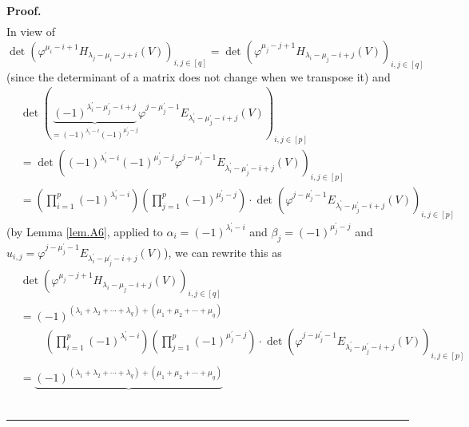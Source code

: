 \documentclass[numbers=enddot,12pt,final,onecolumn,notitlepage]{scrartcl}%
\theoremstyle{definition}
\newenvironment{proof}[1][Proof]{\noindent\textbf{#1.} }{\ \rule{0.5em}{0.5em}}
\let\prodnonlimits\prod
\renewcommand{\prod}{\prodnonlimits\limits}
\begin{document}
\begin{enumerate}
\begin{proof}
\begin{align*}
\end{align*}
In view of%
\[
\det\left(  \varphi^{\mu_{i}-i+1}H_{\lambda_{j}-\mu_{i}-j+i}\left(  V\right)
\right)  _{i,j\in\left[  q\right]  }=\det\left(  \varphi^{\mu_{j}%
-j+1}H_{\lambda_{i}-\mu_{j}-i+j}\left(  V\right)  \right)  _{i,j\in\left[
q\right]  }%
\]
(since the determinant of a matrix does not change when we transpose it) and%
\begin{align*}
&  \det\left(  \underbrace{\left(  -1\right)  ^{\lambda_{i}^{\prime}-\mu
_{j}^{\prime}-i+j}}_{=\left(  -1\right)  ^{\lambda_{i}^{\prime}-i}\left(
-1\right)  ^{\mu_{j}^{\prime}-j}}\varphi^{j-\mu_{j}^{\prime}-1}E_{\lambda
_{i}^{\prime}-\mu_{j}^{\prime}-i+j}\left(  V\right)  \right)  _{i,j\in\left[
p\right]  }\\
&  =\det\left(  \left(  -1\right)  ^{\lambda_{i}^{\prime}-i}\left(  -1\right)
^{\mu_{j}^{\prime}-j}\varphi^{j-\mu_{j}^{\prime}-1}E_{\lambda_{i}^{\prime}%
-\mu_{j}^{\prime}-i+j}\left(  V\right)  \right)  _{i,j\in\left[  p\right]  }\\
&  =\left(  \prod_{i=1}^{p}\left(  -1\right)  ^{\lambda_{i}^{\prime}%
-i}\right)  \left(  \prod_{j=1}^{p}\left(  -1\right)  ^{\mu_{j}^{\prime}%
-j}\right)  \cdot\det\left(  \varphi^{j-\mu_{j}^{\prime}-1}E_{\lambda
_{i}^{\prime}-\mu_{j}^{\prime}-i+j}\left(  V\right)  \right)  _{i,j\in\left[
p\right]  }%
\end{align*}
(by Lemma \ref{lem.A6}, applied to $\alpha_{i}=\left(  -1\right)
^{\lambda_{i}^{\prime}-i}$ and $\beta_{j}=\left(  -1\right)  ^{\mu_{j}%
^{\prime}-j}$ and $u_{i,j}=\varphi^{j-\mu_{j}^{\prime}-1}E_{\lambda
_{i}^{\prime}-\mu_{j}^{\prime}-i+j}\left(  V\right)  $), we can rewrite this
as%
\begin{align*}
&  \det\left(  \varphi^{\mu_{j}-j+1}H_{\lambda_{i}-\mu_{j}-i+j}\left(
V\right)  \right)  _{i,j\in\left[  q\right]  }\\
&  =\left(  -1\right)  ^{\left(  \lambda_{1}+\lambda_{2}+\cdots+\lambda
_{q}\right)  +\left(  \mu_{1}+\mu_{2}+\cdots+\mu_{q}\right)  }\\
&  \ \ \ \ \ \ \ \ \ \ \left(  \prod_{i=1}^{p}\left(  -1\right)  ^{\lambda
_{i}^{\prime}-i}\right)  \left(  \prod_{j=1}^{p}\left(  -1\right)  ^{\mu
_{j}^{\prime}-j}\right)  \cdot\det\left(  \varphi^{j-\mu_{j}^{\prime}%
-1}E_{\lambda_{i}^{\prime}-\mu_{j}^{\prime}-i+j}\left(  V\right)  \right)
_{i,j\in\left[  p\right]  }\\
&  =\underbrace{\left(  -1\right)  ^{\left(  \lambda_{1}+\lambda_{2}%
+\cdots+\lambda_{q}\right)  +\left(  \mu_{1}+\mu_{2}+\cdots+\mu_{q}\right)
}}
\end{align*}
\end{proof}
\end{enumerate}
\end{document}
